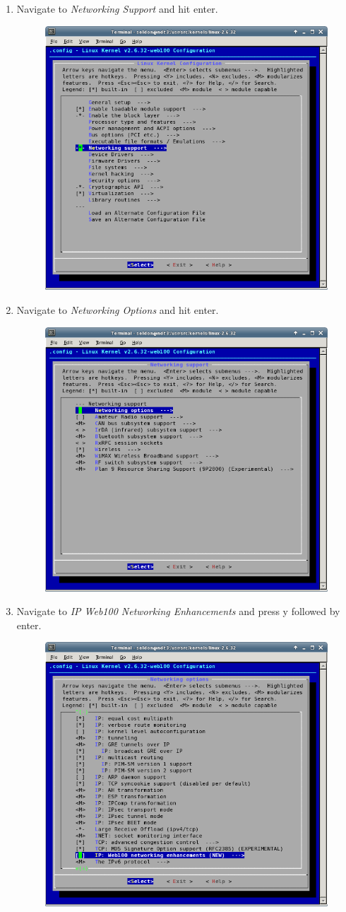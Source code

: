 \begin{enumerate}
\item{Navigate to \textit{Networking Support} and hit enter.}
\begin{figure}[H]
\centering
\includegraphics[width=.55\textwidth]{img/menuconfig_01.png}
\end{figure}

\item{Navigate to \textit{Networking Options} and hit enter.}
\begin{figure}[H]
\centering
\includegraphics[width=.55\textwidth]{img/menuconfig_02.png}
\end{figure}

\item{Navigate to \textit{IP Web100 Networking Enhancements} and press y followed by enter.}
\begin{figure}[H]
\centering
\includegraphics[width=.55\textwidth]{img/menuconfig_03.png}
\end{figure}


\end{enumerate}
